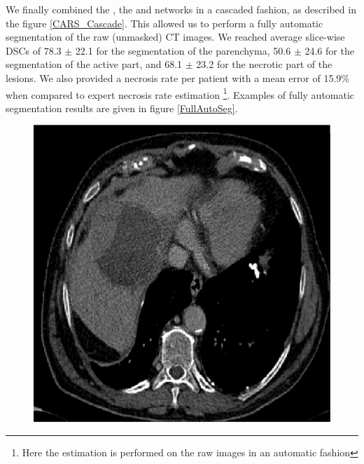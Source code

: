 We finally combined the , the  and  networks in a cascaded fashion, as described in the figure \ref{CARS_Cascade}. This allowed us to perform a fully automatic segmentation of the raw (unmasked) CT images. We reached average slice-wise DSCs of 78.3 $\pm$ 22.1 for the segmentation of the parenchyma, 50.6 $\pm$ 24.6  for the segmentation of the active part, and 68.1 $\pm$ 23.2 for the necrotic part of the lesions. We also provided a necrosis rate per patient with a mean error of 15.9\% when compared to expert necrosis rate estimation \footnote{Here the estimation is performed on the raw images in an automatic fashion}. Examples of fully automatic segmentation results are given in figure \ref{FullAutoSeg}.

\begin{figure}[!ht]
   \centering
\begin{minipage}{4cm}
\includegraphics*[width=\linewidth]{./images/1_7_raw_new_resized}
\end{minipage} \hspace{-0.3cm}
\begin{minipage}{4cm}

\end{minipage}
\end{figure}
